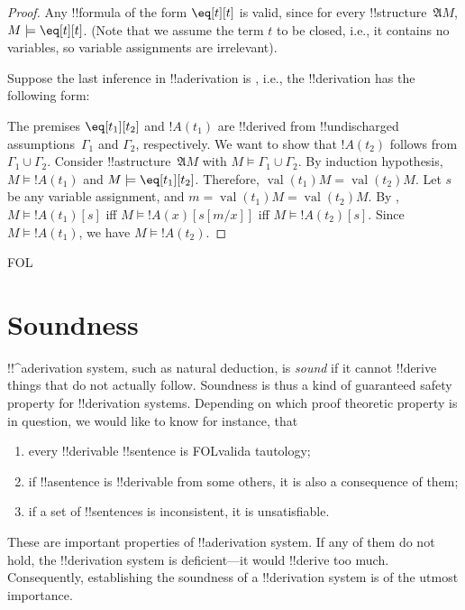 \documentclass[10pt,a4paper]{article}
\makeatletter
\theoremstyle{plain}
\theoremstyle{definition}
\theoremstyle{remark}
\newenvironment{explain}{}{}
\newcommand*{\olfileid}[3]{}
\newcommand*{\olsection}[1]{\section*{#1}}
\newcommand{\olref}{\@ifnextchar[{\olref@i}{\olref@final}}
\def\olref@i[#1]{\@ifnextchar[{\olref@ii}{\olref@final}}
\def\olref@ii[#1]{\@ifnextchar[{\olref@iii}{\olref@final}}
\def\olref@iii[#1]{\olref@final}
\def\olref@final#1{\ref{#1}}
\providecommand{\AxiomC}[1]{}
\providecommand{\BinaryInfC}[1]{}
\providecommand{\RightLabel}[1]{}
\newenvironment{prooftree}{}{}
\providecommand{\Subst}[3]{#1[#2/#3]}
\providecommand{\Struct}{\ensuremath{\mathfrak{A}}}
\providecommand{\Sat}[2]{\ensuremath{#1 \models #2}}
\providecommand{\iftag}[1]{#1}
\providecommand{\Elim}[1]{}
\providecommand{\Value}[1]{\operatorname{val}(#1)}
\makeatother
\begin{document}
\begin{proof}
Any !!{formula} of the form $\eq[t][t]$ is valid, since
for every !!{structure}~$\Struct M$, $\Sat{M}{\eq[t][t]}$. (Note that
we assume the term $t$ to be closed, i.e., it contains no variables,
so variable assignments are irrelevant).

Suppose the last inference in !!a{derivation} is \Elim{\eq}, i.e., the
!!{derivation} has the following form:
\begin{prooftree}
  \AxiomC{$\Gamma_1$}
  \RightLabel{$\delta_1$}
  \DeduceC{$\eq[t_1][t_2]$}
  \AxiomC{$\Gamma_2$}
  \RightLabel{$\delta_2$}
  \RightLabel{\Elim{\eq}}
  \BinaryInfC{$!A(t_2)$}
\end{prooftree}
The premises $\eq[t_1][t_2]$ and $!A(t_1)$ are !!{derive}d from
!!{undischarged} assumptions~$\Gamma_1$ and $\Gamma_2$, respectively.
We want to show that $!A(t_2)$ follows from $\Gamma_1 \cup \Gamma_2$.
Consider !!a{structure}~$\Struct{M}$ with $\Sat{M}{\Gamma_1 \cup
  \Gamma_2}$. By induction hypothesis, $\Sat{M}{!A(t_1)}$ and
$\Sat{M}{\eq[t_1][t_2]}$. Therefore, $\Value{t_1}{M} = \Value{t_2}{M}$. Let
$s$ be any variable assignment, and $m = \Value{t_1}{M} = \Value{t_2}{M}$. By
\olref[fol][syn][ext]{prop:ext-formulas}, $\Sat{M}{!A(t_1)}[s]$ iff
$\Sat{M}{!A(x)}[\Subst{s}{m}{x}]$ iff $\Sat{M}{!A(t_2)}[s]$. Since
$\Sat{M}{!A(t_1)}$, we have $\Sat{M}{!A(t_2)}$.
\end{proof}





\iftag{FOL}
      {\olfileid{fol}{ntd}{sou}}
      {\olfileid{pl}{ntd}{sou}}
      
\olsection{Soundness}

\begin{explain}
!!^a{derivation} system, such as natural deduction, is \emph{sound}
if it cannot !!{derive} things that do not actually follow.  Soundness is
thus a kind of guaranteed safety property for !!{derivation} systems.
Depending on which proof theoretic property is in question, we would
like to know for instance, that
\begin{enumerate}
\item every !!{derivable} !!{sentence} is \iftag{FOL}{valid}{a tautology};
\item if !!a{sentence} is !!{derivable} from some others, it is also a
  consequence of them;
\item if a set of !!{sentence}s is inconsistent, it is unsatisfiable.
\end{enumerate}
These are important properties of !!a{derivation} system. If any of
them do not hold, the !!{derivation} system is deficient---it would
!!{derive} too much.  Consequently, establishing the soundness of a
!!{derivation} system is of the utmost importance.
\end{explain}
\end{document}
